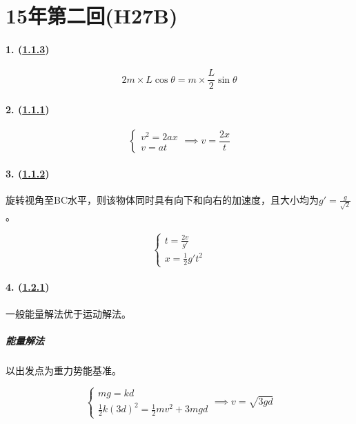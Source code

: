 
\section{15年第二回(H27B)}

\paragraph{1. (\hyperref[subsec:1.1.3]{1.1.3})}

\begin{equation*}
    2m\times L\cos\theta=m\times\frac{L}{2}\sin\theta
\end{equation*}

\paragraph{2. (\hyperref[subsec:1.1.1]{1.1.1})}

\begin{equation*}
    \begin{cases}
        v^2=2ax\\
        v=at
    \end{cases}\implies
    v=\frac{2x}{t}
\end{equation*}

\paragraph{3. (\hyperref[subsec:1.1.2]{1.1.2})} 旋转视角至BC水平，则该物体同时具有向下和向右的加速度，且大小均为$g'=\frac{g}{\sqrt{2}}$。

\begin{equation*}
    \begin{cases}
        t=\frac{2v}{g'}\\
        x=\frac12g't^2
    \end{cases}
\end{equation*}

\paragraph{4. (\hyperref[subsec:1.2.1]{1.2.1})} 一般能量解法优于运动解法。

\subparagraph{能量解法} 以出发点为重力势能基准。

\begin{equation*}
    \begin{cases}
        mg=kd\\
        \frac12k(3d)^2=\frac12mv^2+3mgd
    \end{cases}\implies
    v=\sqrt{3gd}
\end{equation*}

